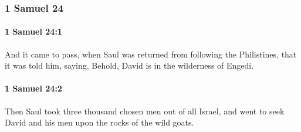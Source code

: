 	\subsubsection{1 Samuel 24} %
		\label{1SAMUEL-24}

		\paragraph{1 Samuel 24:1} %
			\label{1SAMUEL-24-1}

			And it came to pass, when Saul was returned from following the Philistines, that it was told him, saying, Behold, David is in the wilderness of Engedi.


		\paragraph{1 Samuel 24:2} %
			\label{1SAMUEL-24-2}

			Then Saul took three thousand chosen men out of all Israel, and went to seek David and his men upon the rocks of the wild goats.

